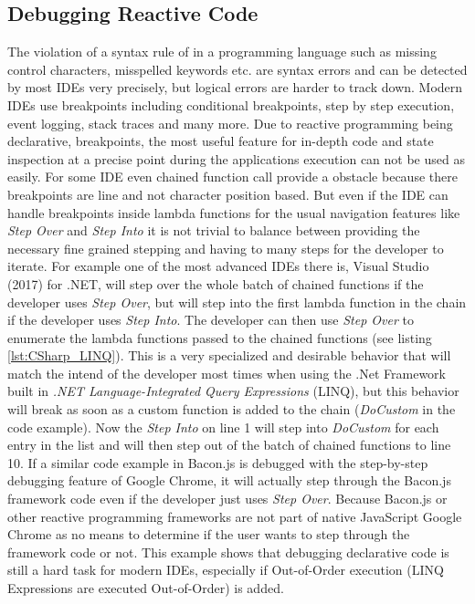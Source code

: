 \subsection{Debugging Reactive Code}
The violation of a syntax rule of in a programming language such as missing control characters, misspelled keywords etc. are syntax errors and can be detected by most IDEs very precisely, but logical errors are harder to track down. Modern IDEs use breakpoints including conditional breakpoints, step by step execution, event logging, stack traces and many more. Due to reactive programming being declarative, breakpoints, the most useful feature for in-depth code and state inspection at a precise point during the applications execution can not be used as easily. For some IDE even chained function call provide a obstacle because there breakpoints are line and not character position based. But even if the IDE can handle breakpoints inside lambda functions for the usual navigation features like \emph{Step Over} and \emph{Step Into} it is not trivial to balance between providing the necessary fine grained stepping and having to many steps for the developer to iterate. For example one of the most advanced IDEs there is, Visual Studio (2017) for .NET, will step over the whole batch of chained functions if the developer uses \emph{Step Over}, but will step into the first lambda function in the chain if the developer uses \emph{Step Into}. The developer can then use \emph{Step Over} to enumerate the lambda functions passed to the chained functions (see listing \ref{lst:CSharp_LINQ}). This is a very specialized and desirable behavior that will match the intend of the developer most times when using the .Net Framework built in \emph{.NET Language-Integrated Query Expressions} (LINQ), but this behavior will break as soon as a custom function is added to the chain (\emph{DoCustom} in the code example). Now the \emph{Step Into} on line 1 will step into \emph{DoCustom} for each entry in the list and will then step out of the batch of chained functions to line 10. If a similar code example in Bacon.js is debugged with the step-by-step debugging feature of Google Chrome, it will actually step through the Bacon.js framework code even if the developer just uses \emph{Step Over}. Because Bacon.js or other reactive programming frameworks are not part of native JavaScript Google Chrome as no means to determine if the user wants to step through the framework code or not.
This example shows that debugging declarative code is still a hard task for modern IDEs, especially if Out-of-Order execution (LINQ Expressions are executed Out-of-Order) is added.
